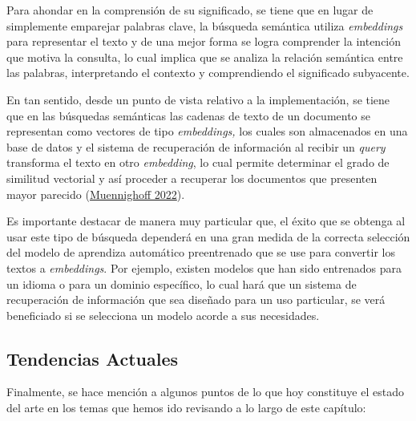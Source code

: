 \documentclass[
  12pt,
  openany]{book}
\begin{document}
Para ahondar en la comprensión de su significado, se tiene que en lugar de simplemente emparejar palabras clave, la búsqueda semántica utiliza \emph{embeddings} para representar el texto y de una mejor forma se logra comprender la intención que motiva la consulta, lo cual implica que se analiza la relación semántica entre las palabras, interpretando el contexto y comprendiendo el significado subyacente.

En tan sentido, desde un punto de vista relativo a la implementación, se tiene que en las búsquedas semánticas las cadenas de texto de un documento se representan como vectores de tipo \emph{embeddings,} los cuales son almacenados en una base de datos y el sistema de recuperación de información al recibir un \emph{query} transforma el texto en otro \emph{embedding}, lo cual permite determinar el grado de similitud vectorial y así proceder a recuperar los documentos que presenten mayor parecido (\protect\hyperlink{ref-muennighoff2022a}{Muennighoff 2022}).

Es importante destacar de manera muy particular que, el éxito que se obtenga al usar este tipo de búsqueda dependerá en una gran medida de la correcta selección del modelo de aprendiza automático preentrenado que se use para convertir los textos a \emph{embeddings}. Por ejemplo, existen modelos que han sido entrenados para un idioma o para un dominio específico, lo cual hará que un sistema de recuperación de información que sea diseñado para un uso particular, se verá beneficiado si se selecciona un modelo acorde a sus necesidades.

\hypertarget{tendencias-actuales}{%
\subsection{Tendencias Actuales}\label{tendencias-actuales}}

Finalmente, se hace mención a algunos puntos de lo que hoy constituye el estado del arte en los temas que hemos ido revisando a lo largo de este capítulo:
\end{document}
